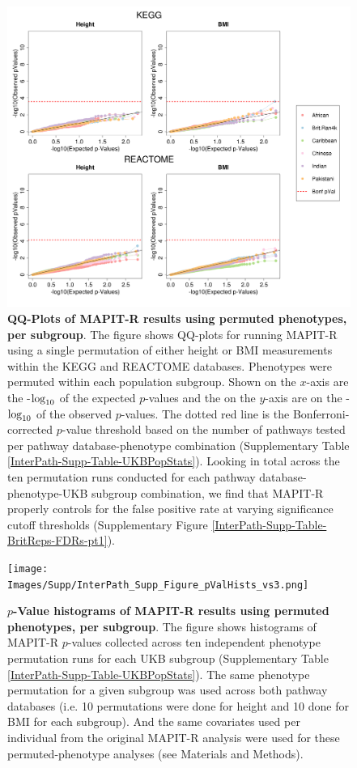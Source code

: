 \documentclass[10pt,a4paper]{article}
\def\log{{\rm log}}
\begin{document}
\begin{figure}[htbp]
\centering
\includegraphics[scale=.35]{Images/Supp/InterPath_Supp_Figure_perm1_QQPlots_AllPaths_vs2.png}
\caption[TBD]{\textbf{QQ-Plots of MAPIT-R results using permuted phenotypes, per subgroup}. The figure shows QQ-plots for running MAPIT-R using a single permutation of either height or BMI measurements within the KEGG and REACTOME databases. Phenotypes were permuted within each population subgroup. Shown on the $x$-axis are the -$\log_{10}$ of the expected $p$-values and the on the $y$-axis are on the -$\log_{10}$ of the observed $p$-values. The dotted red line is the Bonferroni-corrected $p$-value threshold based on the number of pathways tested per pathway database-phenotype combination (Supplementary Table \ref{InterPath-Supp-Table-UKBPopStats}). Looking in total across the ten permutation runs conducted for each pathway database-phenotype-UKB subgroup combination, we find that MAPIT-R properly controls for the false positive rate at varying significance cutoff thresholds (Supplementary Figure \ref{InterPath-Supp-Table-BritReps-FDRs-pt1}).}
\label{InterPath-Supp-Figure-perm1-QQPlots-AllPaths}
\end{figure}
\clearpage

\setlength{\footskip}{3cm}
\begin{figure}[htbp]
\centering
\vspace*{-2cm}
\texttt{[image: Images/Supp/InterPath\_Supp\_Figure\_pValHists\_vs3.png]}
\caption[TBD]{\textbf{$p$-Value histograms of MAPIT-R results using permuted phenotypes, per subgroup}. The figure shows histograms of MAPIT-R $p$-values collected across ten independent phenotype permutation runs for each UKB subgroup (Supplementary Table \ref{InterPath-Supp-Table-UKBPopStats}). The same phenotype permutation for a given subgroup was used across both pathway databases (i.e. 10 permutations were done for height and 10 done for BMI for each subgroup). And the same covariates used per individual from the original MAPIT-R analysis were used for these permuted-phenotype analyses (see Materials and Methods).}
\label{InterPath-Supp-Figure-10perms-pValHists}
\end{figure}
\clearpage
\setlength{\footskip}{1cm}
\end{document}
